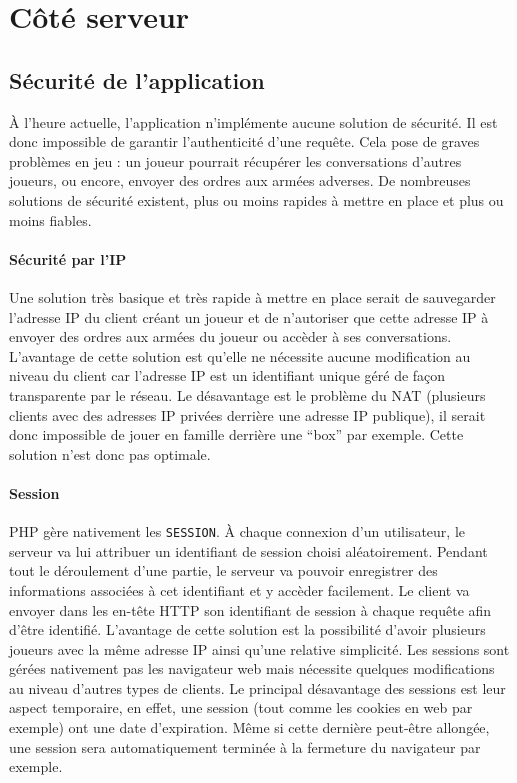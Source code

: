 \section{Côté serveur}

	\subsection{Sécurité de l'application} %
	\label{sub:securite_de_l_application}

		À l'heure actuelle, l'application n'implémente aucune solution de sécurité. Il est donc impossible de garantir l'authenticité d'une requête. Cela pose de graves problèmes en jeu : un joueur pourrait récupérer les conversations d'autres joueurs, ou encore, envoyer des ordres aux armées adverses. De nombreuses solutions de sécurité existent, plus ou moins rapides à mettre en place et plus ou moins fiables.

		\paragraph{Sécurité par l'IP} %
		\label{par:securite_par_l_ip}
		
			Une solution très basique et très rapide à mettre en place serait de sauvegarder l'adresse IP du client créant un joueur et de n'autoriser que cette adresse IP à envoyer des ordres aux armées du joueur ou accèder à ses conversations. L'avantage de cette solution est qu'elle ne nécessite aucune modification au niveau du client car l'adresse IP est un identifiant unique géré de façon transparente par le réseau. Le désavantage est le problème du NAT (plusieurs clients avec des adresses IP privées derrière une adresse IP publique), il serait donc impossible de jouer en famille derrière une \enquote{box} par exemple. Cette solution n'est donc pas optimale.


		\paragraph{Session} %
		\label{par:session}
		
			PHP gère nativement les \texttt{SESSION}. À chaque connexion d'un utilisateur, le serveur va lui attribuer un identifiant de session choisi aléatoirement. Pendant tout le déroulement d'une partie, le serveur va pouvoir enregistrer des informations associées à cet identifiant et y accèder facilement. Le client va envoyer dans les en-tête HTTP son identifiant de session à chaque requête afin d'être identifié. L'avantage de cette solution est la possibilité d'avoir plusieurs joueurs avec la même adresse IP ainsi qu'une relative simplicité. Les sessions sont gérées nativement pas les navigateur web mais nécessite quelques modifications au niveau d'autres types de clients. Le principal désavantage des sessions est leur aspect temporaire, en effet, une session (tout comme les cookies en web par exemple) ont une date d'expiration. Même si cette dernière peut-être allongée, une session sera automatiquement terminée à la fermeture du navigateur par exemple.

